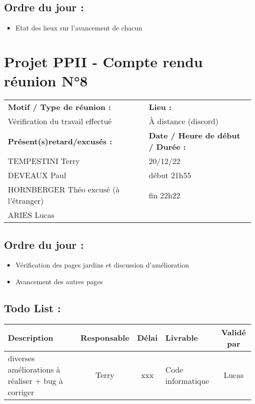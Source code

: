 \documentclass[12pt,titlepage]{report}
\begin{document}
\subsection*{Ordre du jour :}
\begin{itemize}
    \item{Etat des lieux sur l'avancement de chacun}
\end{itemize}
\newpage

\section*{Projet PPII - Compte rendu réunion N°8}
\begin{tabular}{|p{7cm}|p{6cm}|}
    \hline
    \textbf{Motif / Type de réunion :}
    & \textbf{Lieu :}
    \\
    Vérification du travail effectué
    & 
    À distance (discord)
    \\ \hline
    \textbf{Présent(s)retard/excusés :}
    &
    \textbf{Date / Heure de début / Durée :}
    \\ 
    TEMPESTINI Terry &  20/12/22\\  
    DEVEAUX Paul & début 21h55\\
    HORNBERGER Théo excusé (à l'étranger) & fin 22h22\\
    ARIES Lucas & 
    \\ \hline
\end{tabular}

\subsection*{Ordre du jour :}
\begin{itemize}
    \item{Vérification des pages jardins et discussion d'amélioration}
    \item{Avancement des autres pages}
\end{itemize}

\subsection*{Todo List :}
\begin{tabular}{|p{3.5cm}|c|c|p{4.5cm}|c|}
    \hline 
    Description & Responsable & Délai & Livrable & Validé par 
    \\ \hline
    diverses améliorations à réaliser + bug à corriger & Terry & xxx & Code informatique & Lucas\\ \hline
    
\end{tabular}
\newpage
\end{document}
